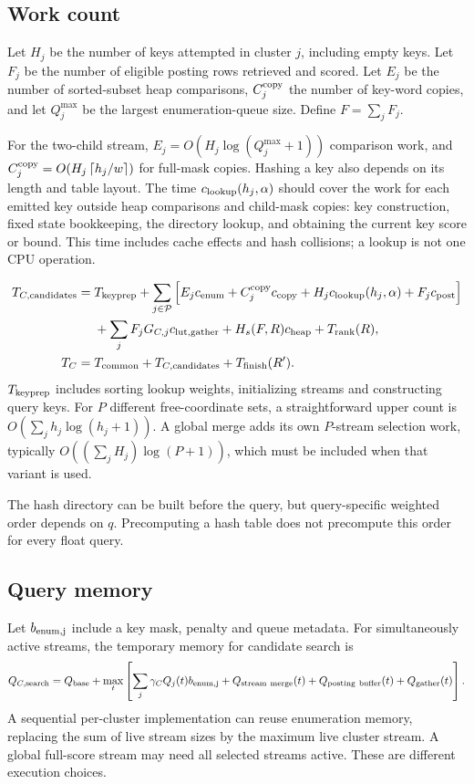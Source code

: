 \subsection{Work count}
Let $H_j$ be the number of keys attempted in cluster $j$, including empty keys. Let $F_j$ be
the number of eligible posting rows retrieved and scored. Let $E_j$ be the number of
sorted-subset heap comparisons, $C_j^{\rm copy}$ the number of key-word copies, and let
$Q_j^{\max}$ be the largest enumeration-queue size. Define $F=\sum_jF_j$.

For the two-child stream, $E_j=O(H_j\log(Q_j^{\max}+1))$ comparison work, and
$C_j^{\rm copy}=O(H_j\left\lceil h_j/w\right\rceil)$ for full-mask copies. Hashing a key also depends on its
length and table layout. The time $c_{\rm lookup}(h_j,\alpha)$ should cover the work for each emitted key outside heap comparisons and child-mask copies: key construction, fixed state bookkeeping, the directory lookup, and obtaining the current key score or bound. This time includes cache effects and hash collisions; a lookup is not one CPU operation.

\begin{align}
T_{C,\rm candidates}={}&T_{\rm keyprep}
 +\sum_{j\in\mathcal P}\Big[
 E_jc_{\rm enum}+C_j^{\rm copy}c_{\rm copy}
 +H_jc_{\rm lookup}(h_j,\alpha)+F_jc_{\rm post}\Big]\notag\\
 &+\sum_j F_jG_{C,j}c_{\rm lut,gather}+H_s(F,R)c_{\rm heap}+T_{\rm rank}(R),
\label{eq:keys-time}\\
T_C={}&T_{\mathrm{common}}+T_{C,\rm candidates}+T_{\mathrm{finish}}(R').
\label{eq:keys-total}
\end{align}
$T_{\rm keyprep}$ includes sorting lookup weights, initializing streams and constructing
query keys. For $P$ different free-coordinate sets, a straightforward upper count is
$O(\sum_jh_j\log(h_j+1))$. A global merge adds its own $P$-stream selection work, typically
$O((\sum_jH_j)\log(P+1))$, which must be included when that variant is used.

The hash directory can be built before the query, but query-specific weighted order depends
on $q$. Precomputing a hash table does not precompute this order for every float query.

\subsection{Query memory}
Let $b_{\rm enum,j}$ include a key mask, penalty and queue metadata. For simultaneously active
streams, the temporary memory for candidate search is
\begin{equation}
Q_{C,\rm search}=Q_{\mathrm{base}}+
 \max_t\left[\sum_j\gamma_C Q_j(t)b_{\rm enum,j}
             +Q_{\rm stream\ merge}(t)+Q_{\rm posting\ buffer}(t)
             +Q_{\rm gather}(t)\right].
\label{eq:keys-ram}
\end{equation}
A sequential per-cluster implementation can reuse enumeration memory, replacing the sum of
live stream sizes by the maximum live cluster stream. A global full-score stream may need
all selected streams active. These are different execution choices.

